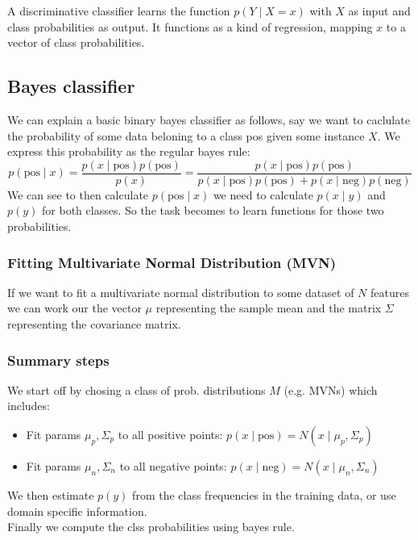 \documentclass[12pt]{article}
\begin{document}
\begin{definition}
    A discriminative classifier learns the function $p(Y\mid X=x)$ with $X$ as input and class probabilities as output. It functions as a kind of regression, mapping $x$ to a vector of class probabilities.
\end{definition}


\subsection{Bayes classifier}

We can explain a basic binary bayes classifier as follows, say we want to caclulate the probability of some data beloning to a class pos given some instance $X$. We express this probability as the regular bayes rule: 
\[
    p(\text{pos}\mid x) = \frac{p(x\mid \text{pos})p(\text{pos})}{p(x)} = \frac{p(x\mid \text{pos})p(\text{pos})}{p(x\mid \text{pos})p(\text{pos}) + p(x\mid \text{neg})p(\text{neg})}
\]
We can see to then calculate $p(\text{pos}\mid x)$ we need to calculate $p(x\mid y)$ and $p(y)$ for both classes. So the task becomes to learn functions for those two probabilities.

\subsubsection*{Fitting Multivariate Normal Distribution (MVN)}

If we want to fit a multivariate normal distribution to some dataset of $N$ features we can work our the vector $\mu$ representing the sample mean and the matrix $\Sigma$ representing the covariance matrix.  

\subsubsection*{Summary steps}

We start off by chosing a class of prob. distributions $M$ (e.g. MVNs) which includes: 
\begin{itemize}[leftmargin=*, noitemsep]
    \item Fit params $\mu_p, \Sigma_p$ to all positive points: $p(x\mid \text{pos}) = N(x\mid \mu_p, \Sigma_p)$
    \item Fit params $\mu_n, \Sigma_n$ to all negative points: $p(x\mid \text{neg}) = N(x\mid \mu_n, \Sigma_n)$
\end{itemize}

We then estimate $p(y)$ from the class frequencies in the training data, or use domain specific information.\\
Finally we compute the clss probabilities using bayes rule. 
\end{document}

